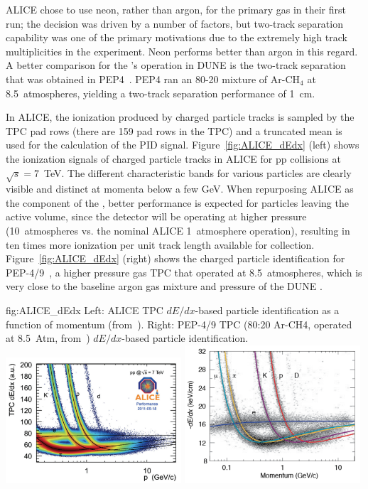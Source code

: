 ALICE chose to use neon, rather than argon, for the primary gas in their first run; the decision was driven by a number of factors, but two-track separation capability was one of the primary motivations due to the extremely high track multiplicities in the experiment.  Neon performs better than argon in this regard.  A better comparison for the 's operation in DUNE is the two-track separation that was obtained in PEP4~\cite{PEP4_Stork}.  PEP4 ran an 80-20 mixture of Ar-CH$_4$ at 8.5~atmospheres, yielding a two-track separation performance of \SI{1}{cm}.

In ALICE, the ionization produced by charged particle tracks is sampled by the TPC pad rows (there are 159 pad rows in the TPC) and a truncated mean is used for the calculation of the PID signal. Figure~\ref{fig:ALICE_dEdx} (left) shows the ionization signals of charged particle tracks in ALICE for pp collisions at $\sqrt{s} = 7$~TeV. The different characteristic bands for various particles are clearly visible and distinct at momenta below a few GeV.  When repurposing ALICE as the  component of the ,  better performance is expected for particles leaving the active volume, since the detector will be operating at higher pressure (10~atmospheres vs. the nominal ALICE 1~atmosphere operation), resulting in ten times more ionization per unit track length available for collection. Figure~\ref{fig:ALICE_dEdx} (right) shows the charged particle identification for PEP-4/9~\cite{Grupen:1999by}, a higher pressure gas TPC that operated at 8.5~atmospheres, which is very close to the baseline argon gas mixture and pressure of the DUNE .


\begin{dunefigure}{fig:ALICE_dEdx}
{Left: ALICE TPC $dE/dx$-based particle identification as a function of momentum (from~\cite{ALICE_Lippmann}). Right: PEP-4/9 TPC (80:20 Ar-CH4, operated at 8.5~Atm, from~\cite{Grupen:1999by}) $dE/dx$-based particle identification.}
\includegraphics[width=0.49\textwidth]{graphics/ALICE_TPC_dEdx_Lippmann_2012.png}
\includegraphics[width=0.49\textwidth]{graphics/PEP4-TPC-80Ar-20CH4-8_5atm_dEdx.png} 
\end{dunefigure}

